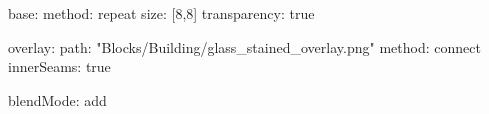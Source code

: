 base:
  method: repeat
  size: [8,8]
  transparency: true
  
overlay:
  path: "Blocks/Building/glass_stained_overlay.png"
  method: connect
  innerSeams: true

blendMode: add